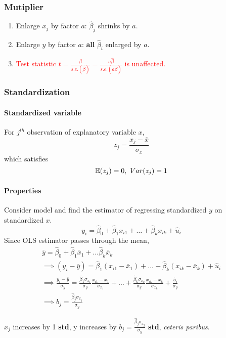 \documentclass[]{article}
\begin{document}
    		\subsubsection{Mutiplier}
    		\begin{enumerate}
    			\item Enlarge $x_j$ by factor $a$: $\hat{\beta}_j$ shrinks by $a$.
    			\item Enlarge $y$ by factor $a$: \textbf{all} $\hat{\beta}_i$ enlarged by $a$.
    			\item \textcolor{red}{Test statistic $t = \frac{\hat{\beta}}{s.e.(\hat{\beta})} = \frac{a\hat{\beta}}{s.e.(a \hat{\beta})}$ is unaffected.}
    		\end{enumerate}
    	
    		\subsubsection{Standardization}
    			\paragraph{Standardized variable} For $j^{th}$ observation of explanatory variable $x$, 
    				\[
    					z_j = \frac{x_j - \overline{x}}{\sigma_{x}}
    				\]
    				which satisfies
    				\[
    					\mathbb{E}({z_j}) = 0,\ Var(z_j) = 1
    				\]
    			\paragraph{Properties} Consider model and find the estimator of regressing standardized $y$ on standardized $x$.
    				\[
    					y_i = \hat{\beta}_0 + \hat{\beta}_1 x_{i1} + \dots + \hat{\beta}_k x_{ik} + \hat{u}_i
    				\]
    				Since OLS estimator passes through the mean,
    				\begin{gather*}
    					\overline{y} = \hat{\beta}_0 + \hat{\beta}_1 \overline{x}_1 + \dots \hat{\beta}_k \overline{x}_k \\
    					\implies (y_i - \overline{y}) = \hat{\beta}_1 (x_{i1} - \overline{x}_1) + \dots + \hat{\beta}_k (x_{ik} - \overline{x}_k) + \hat{u}_i \\
    					\implies \frac{y_i - \overline{y}}{\sigma_y} = 
    					\frac{\hat{\beta}_1 \sigma_{x_1}}{\sigma_y} \frac{x_{i1} - \overline{x}_1}{\sigma_{x_1}} + \dots + 
    					\frac{\hat{\beta}_k \sigma_{x_k}}{\sigma_y} \frac{x_{ik} - \overline{x}_k}{\sigma_{x_k}} + \frac{\hat{u}_i}{\sigma_y} \\
    					\implies b_j = \frac{\hat{\beta}_j \sigma_{x_j}}{\sigma_y}
    				\end{gather*}
    			\begin{remark}[Interpretation]
    				$x_j$ increases by 1 \textbf{std}, y increases by $b_j = \frac{\hat{\beta}_j \sigma_{x_j}}{\sigma_y}$ \textbf{std}, \emph{ceteris paribus}.
    			\end{remark}
\end{document}
